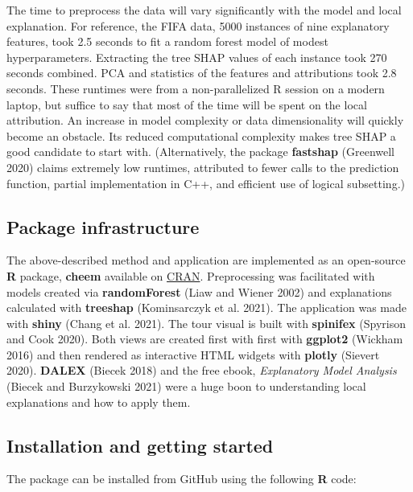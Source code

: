 \documentclass[
]{article}
\begin{document}
The time to preprocess the data will vary significantly with the model and local explanation. For reference, the FIFA data, 5000 instances of nine explanatory features, took 2.5 seconds to fit a random forest model of modest hyperparameters. Extracting the tree SHAP values of each instance took 270 seconds combined. PCA and statistics of the features and attributions took 2.8 seconds. These runtimes were from a non-parallelized R session on a modern laptop, but suffice to say that most of the time will be spent on the local attribution. An increase in model complexity or data dimensionality will quickly become an obstacle. Its reduced computational complexity makes tree SHAP a good candidate to start with. (Alternatively, the package \textbf{fastshap} (Greenwell 2020) claims extremely low runtimes, attributed to fewer calls to the prediction function, partial implementation in C++, and efficient use of logical subsetting.)

\hypertarget{sec:infrastructure}{%
\subsection{Package infrastructure}\label{sec:infrastructure}}

The above-described method and application are implemented as an open-source \textbf{R} package, \textbf{cheem} available on \href{https://CRAN.R-project.org/package=cheem}{CRAN}. Preprocessing was facilitated with models created via \textbf{randomForest} (Liaw and Wiener 2002) and explanations calculated with \textbf{treeshap} (Kominsarczyk et al. 2021). The application was made with \textbf{shiny} (Chang et al. 2021). The tour visual is built with \textbf{spinifex} (Spyrison and Cook 2020). Both views are created first with first with \textbf{ggplot2} (Wickham 2016) and then rendered as interactive HTML widgets with \textbf{plotly} (Sievert 2020). \textbf{DALEX} (Biecek 2018) and the free ebook, \emph{Explanatory Model Analysis} (Biecek and Burzykowski 2021) were a huge boon to understanding local explanations and how to apply them.

\hypertarget{installation-and-getting-started}{%
\subsection{Installation and getting started}\label{installation-and-getting-started}}

The package can be installed from GitHub using the following \textbf{R} code:
\end{document}
